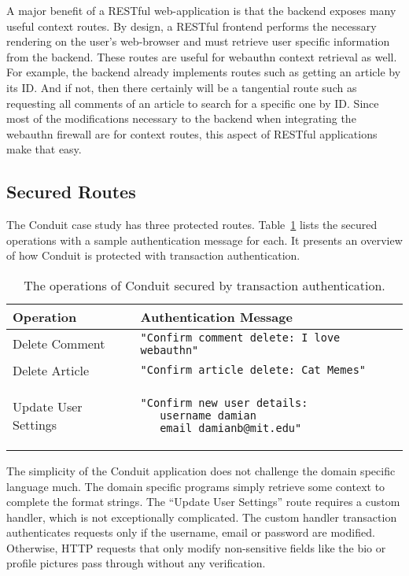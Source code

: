 A major benefit of a RESTful web-application is that the backend exposes many useful context routes. By design, a RESTful frontend performs the necessary rendering on the user's web-browser and must retrieve user specific information from the backend. These routes are useful for webauthn context retrieval as well. For example, the backend already implements routes such as getting an article by its ID. And if not, then there certainly will be a tangential route such as requesting all comments of an article to search for a specific one by ID. Since most of the modifications necessary to the backend when integrating the webauthn firewall are for context routes, this aspect of RESTful applications make that easy.

\subsection{Secured Routes}

The Conduit case study has three protected routes. Table~\ref{Table:ConduitSecuredRoutes} lists the secured operations with a sample authentication message for each. It presents an overview of how Conduit is protected with transaction authentication.

\begin{table}[h]
\centering

\begin{tabular}{ m{5cm} m{9cm}  } 
 \hline
 Operation & Authentication Message \\ 
 \hline \hline

 Delete Comment & \lstinline{"Confirm comment delete: I love webauthn"} \\ \hline

 Delete Article & \lstinline{"Confirm article delete: Cat Memes"} \\ \hline

 Update User Settings & 
 \begin{lstlisting} 
"Confirm new user details:
   username damian
   email damianb@mit.edu"
\end{lstlisting} 
\\ \hline

\end{tabular}
\caption{The operations of Conduit secured by transaction authentication.}
\label{Table:ConduitSecuredRoutes}
\end{table}

The simplicity of the Conduit application does not challenge the domain specific language much. The domain specific programs simply retrieve some context to complete the format strings. The ``Update User Settings'' route requires a custom handler, which is not exceptionally complicated. The custom handler transaction authenticates requests only if the username, email or password are modified. Otherwise, HTTP requests that only modify non-sensitive fields like the bio or profile pictures pass through without any verification.

